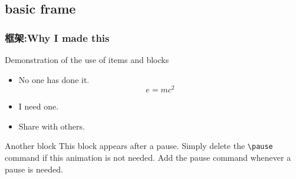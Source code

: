 \subsection{basic frame}

\begin{frame}
\frametitle{框架:Why I made this}
\begin{block}{Demonstration of the use of items and blocks}
\begin{itemize}
\item No one has done it.$$e=mc^2$$
\item I need one.
\pause \item Share with others.
\end{itemize}
\end{block}
\pause
\begin{block}{Another block}
This block appears after a pause. Simply delete the \texttt{\textbackslash pause} command if this animation is not needed. Add the pause command whenever a pause is needed. 
\end{block}
\end{frame}
